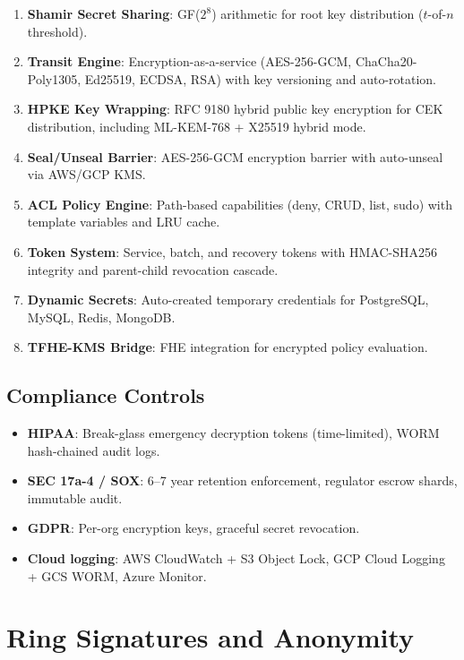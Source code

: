 \documentclass[11pt,letterpaper]{article}
\begin{document}
\begin{enumerate}
\item \textbf{Shamir Secret Sharing}: GF($2^8$) arithmetic for root key distribution ($t$-of-$n$ threshold).
\item \textbf{Transit Engine}: Encryption-as-a-service (AES-256-GCM, ChaCha20-Poly1305, Ed25519, ECDSA, RSA) with key versioning and auto-rotation.
\item \textbf{HPKE Key Wrapping}: RFC 9180 hybrid public key encryption for CEK distribution, including ML-KEM-768 + X25519 hybrid mode.
\item \textbf{Seal/Unseal Barrier}: AES-256-GCM encryption barrier with auto-unseal via AWS/GCP KMS.
\item \textbf{ACL Policy Engine}: Path-based capabilities (deny, CRUD, list, sudo) with template variables and LRU cache.
\item \textbf{Token System}: Service, batch, and recovery tokens with HMAC-SHA256 integrity and parent-child revocation cascade.
\item \textbf{Dynamic Secrets}: Auto-created temporary credentials for PostgreSQL, MySQL, Redis, MongoDB.
\item \textbf{TFHE-KMS Bridge}: FHE integration for encrypted policy evaluation.
\end{enumerate}

\subsection{Compliance Controls}

\begin{itemize}
\item \textbf{HIPAA}: Break-glass emergency decryption tokens (time-limited), WORM hash-chained audit logs.
\item \textbf{SEC 17a-4 / SOX}: 6--7 year retention enforcement, regulator escrow shards, immutable audit.
\item \textbf{GDPR}: Per-org encryption keys, graceful secret revocation.
\item \textbf{Cloud logging}: AWS CloudWatch + S3 Object Lock, GCP Cloud Logging + GCS WORM, Azure Monitor.
\end{itemize}

\section{Ring Signatures and Anonymity}
\end{document}
